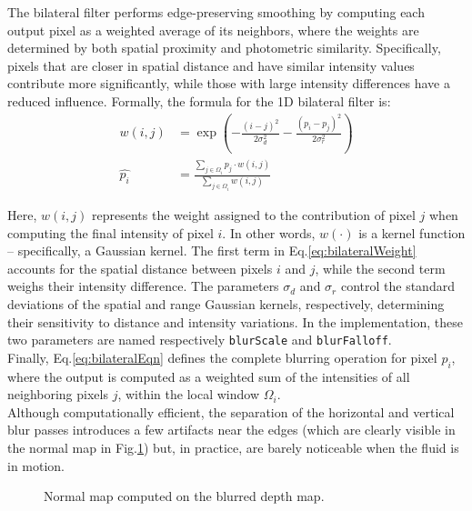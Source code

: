\noindent
The bilateral filter performs edge-preserving smoothing by computing each output pixel as a weighted average of its neighbors, where the weights are determined by both spatial proximity and photometric similarity. Specifically, pixels that are closer in spatial distance and have similar intensity values contribute more significantly, while those with large intensity differences have a reduced influence.
Formally, the formula for the 1D bilateral filter is:
\begin{align}
    w(i, j) &= \exp \left(-\frac{(i-j)^2}{2\sigma^2_d}-\frac{(p_i - p_j)^2}{2\sigma^2_r}\right) \label{eq:bilateralWeight}\\
    \hat{p_i} &= \frac{\sum_{j\in\Omega_i}p_j \cdot w(i,j)}{\sum_{j\in\Omega_i} w(i,j)}\label{eq:bilateralEqn}
\end{align}

\noindent
Here, $w(i,j)$ represents the weight assigned to the contribution of pixel $j$ when computing the final intensity of pixel $i$. In other words, $w(\cdot)$ is a kernel function -- specifically, a Gaussian kernel. The first term in Eq.\ref{eq:bilateralWeight} accounts for the spatial distance between pixels $i$ and $j$, while the second term weighs their intensity difference. The parameters $\sigma_d$ and $\sigma_r$ control the standard deviations of the spatial and range Gaussian kernels, respectively, determining their sensitivity to distance and intensity variations. In the implementation, these two parameters are named respectively \texttt{blurScale} and \texttt{blurFalloff}.\\
Finally, Eq.\ref{eq:bilateralEqn} defines the complete blurring operation for pixel $p_i$, where the output is computed as a weighted sum of the intensities of all neighboring pixels $j$, within the local window $\Omega_i$.\\

\noindent
Although computationally efficient, the separation of the horizontal and vertical blur passes introduces a few artifacts near the edges (which are clearly visible in the normal map in Fig.\ref{fig:normalMap}) but, in practice, are barely noticeable when the fluid is in motion.

\begin{figure}[ht!]
    \centering
    \caption{Normal map computed on the blurred depth map.}\label{fig:normalMap}
\end{figure}

